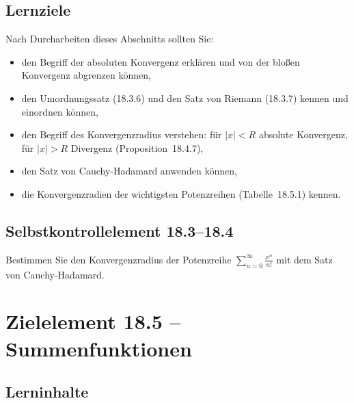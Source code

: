 \documentclass[a4paper,12pt]{article}
\begin{document}
\subsection*{Lernziele}

Nach Durcharbeiten dieses Abschnitts sollten Sie:
\begin{itemize}
  \item den Begriff der absoluten Konvergenz erklären und von der bloßen
        Konvergenz abgrenzen können,
  \item den Umordnungssatz (18.3.6) und den Satz von Riemann (18.3.7)
        kennen und einordnen können,
  \item den Begriff des Konvergenzradius verstehen: für $|x| < R$ absolute
        Konvergenz, für $|x| > R$ Divergenz (Proposition~18.4.7),
  \item den Satz von Cauchy-Hadamard anwenden können,
  \item die Konvergenzradien der wichtigsten Potenzreihen (Tabelle~18.5.1) kennen.
\end{itemize}

\subsection*{Selbstkontrollelement 18.3--18.4}

Bestimmen Sie den Konvergenzradius der Potenzreihe
$\displaystyle\sum_{n=0}^{\infty} \frac{x^n}{n!}$ mit dem Satz von Cauchy-Hadamard.

\newpage

\section*{Zielelement 18.5 -- Summenfunktionen}

\subsection*{Lerninhalte}

\begin{center}
\end{center}
\end{document}
